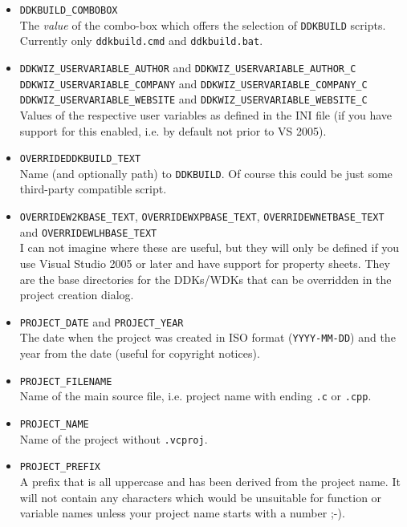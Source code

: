 \documentclass[a4paper,titlepage]{report}
\begin{document}
\begin{itemize}
  \item \verb+DDKBUILD_COMBOBOX+\\
        The \emph{value} of the combo-box which offers the selection of \texttt{DDKBUILD}
        scripts. Currently only \texttt{ddkbuild.cmd} and \texttt{ddkbuild.bat}.
  \item \verb+DDKWIZ_USERVARIABLE_AUTHOR+ and \verb+DDKWIZ_USERVARIABLE_AUTHOR_C+\\
        \verb+DDKWIZ_USERVARIABLE_COMPANY+ and \verb+DDKWIZ_USERVARIABLE_COMPANY_C+\\
        \verb+DDKWIZ_USERVARIABLE_WEBSITE+ and \verb+DDKWIZ_USERVARIABLE_WEBSITE_C+\\
        Values of the respective user variables as defined in the INI file (if
        you have support for this enabled, i.e. by default not prior to VS 2005).
  \item \verb+OVERRIDEDDKBUILD_TEXT+\\
        Name (and optionally path) to \texttt{DDKBUILD}. Of course this could be
        just some third-party compatible script.
  \item \verb+OVERRIDEW2KBASE_TEXT+, \verb+OVERRIDEWXPBASE_TEXT+, \verb+OVERRIDEWNETBASE_TEXT+ and \verb+OVERRIDEWLHBASE_TEXT+\\
        I can not imagine where these are useful, but they will only be defined
        if you use Visual Studio 2005 or later and have support for property sheets.
        They are the base directories for the DDKs/WDKs that can be overridden in
        the project creation dialog.
  \item \verb+PROJECT_DATE+ and \verb+PROJECT_YEAR+\\
        The date when the project was created in ISO format (\texttt{YYYY-MM-DD})
        and the year from the date (useful for copyright notices).
  \item \verb+PROJECT_FILENAME+\\
        Name of the main source file, i.e. project name with ending \texttt{.c} or \texttt{.cpp}.
  \item \verb+PROJECT_NAME+\\
        Name of the project without \texttt{.vcproj}.
  \item \verb+PROJECT_PREFIX+\\
        A prefix that is all uppercase and has been derived from the project name.
        It will not contain any characters which would be unsuitable for function
        or variable names unless your project name starts with a number \textsf{;-)}.
\end{itemize}
\end{document}
